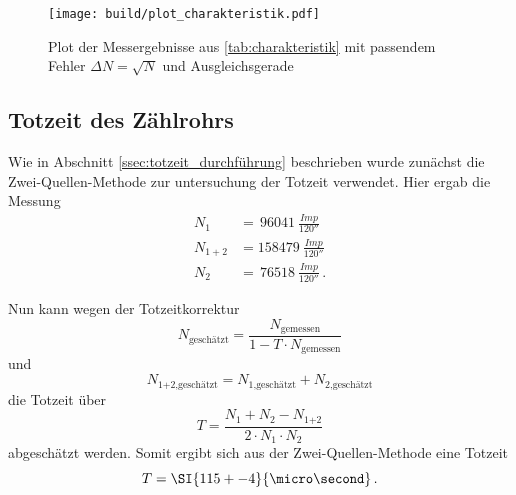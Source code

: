 \begin{figure}
    \centering
    \texttt{[image: build/plot\_charakteristik.pdf]}
    \caption{Plot der Messergebnisse aus \autoref{tab:charakteristik} mit passendem Fehler $\Delta N = \sqrt{N}$ und Ausgleichsgerade}
    \label{fig:plot_charakteristik}
\end{figure}


\subsection{Totzeit des Zählrohrs}
\label{ssec:totzeit_auswertung}

Wie in Abschnitt \ref{ssec:totzeit_durchführung} beschrieben wurde zunächst die Zwei-Quellen-Methode zur untersuchung der Totzeit verwendet.
Hier ergab die Messung
\begin{align*}
    N_1 &= \,\SI{96041}{\frac{Imp}{120\second}} \\
    N_{1+2} &= \SI{158479}{\frac{Imp}{120\second}} \\
    N_2 &= \,\SI{76518}{\frac{Imp}{120\second}} \, .
\end{align*}

Nun kann wegen der Totzeitkorrektur
\begin{equation}
    N_\text{geschätzt} = \frac{N_\text{gemessen}}{1-T \cdot N_\text{gemessen}}
\end{equation}
und
\begin{equation}
    N_\text{1+2,geschätzt} = N_\text{1,geschätzt} + N_\text{2,geschätzt}
\end{equation}
die Totzeit über
\begin{equation}
    T = \frac{N_1 + N_2 - N_\text{1+2}}{2 \cdot N_1 \cdot N_2}
\end{equation}
abgeschätzt werden.
Somit ergibt sich aus der Zwei-Quellen-Methode eine Totzeit 
\begin{equation*}
    T = \SI{115+-4}{\micro\second} \, .
\end{equation*}

